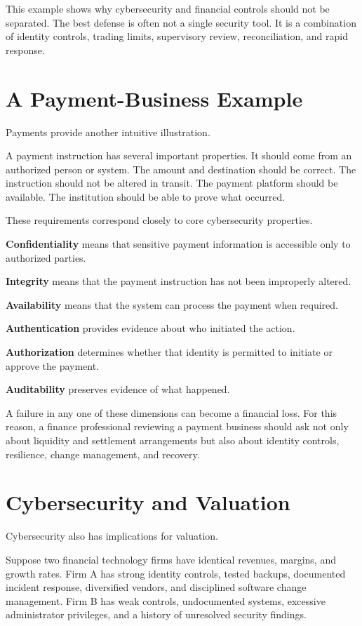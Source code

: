 This example shows why cybersecurity and financial controls should not be separated. The best defense is often not a single security tool. It is a combination of identity controls, trading limits, supervisory review, reconciliation, and rapid response.

\section{A Payment-Business Example}

Payments provide another intuitive illustration.

A payment instruction has several important properties. It should come from an authorized person or system. The amount and destination should be correct. The instruction should not be altered in transit. The payment platform should be available. The institution should be able to prove what occurred.

These requirements correspond closely to core cybersecurity properties.

\textbf{Confidentiality} means that sensitive payment information is accessible only to authorized parties.

\textbf{Integrity} means that the payment instruction has not been improperly altered.

\textbf{Availability} means that the system can process the payment when required.

\textbf{Authentication} provides evidence about who initiated the action.

\textbf{Authorization} determines whether that identity is permitted to initiate or approve the payment.

\textbf{Auditability} preserves evidence of what happened.

A failure in any one of these dimensions can become a financial loss. For this reason, a finance professional reviewing a payment business should ask not only about liquidity and settlement arrangements but also about identity controls, resilience, change management, and recovery.

\section{Cybersecurity and Valuation}

Cybersecurity also has implications for valuation.

Suppose two financial technology firms have identical revenues, margins, and growth rates. Firm A has strong identity controls, tested backups, documented incident response, diversified vendors, and disciplined software change management. Firm B has weak controls, undocumented systems, excessive administrator privileges, and a history of unresolved security findings.

